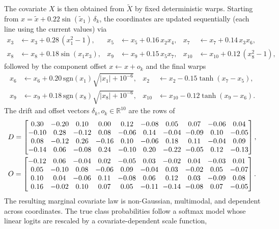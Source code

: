 \documentclass[11pt]{article}
\theoremstyle{statplain}
\theoremstyle{statdefinition}
\newcommand{\0}{\mathbf{0}}
\begin{document}
The covariate $X$ is then obtained from $\widetilde{X}$ by fixed deterministic warps. Starting from $x = \tilde{x} + 0.22\sin(\tilde{x}_1)\,\delta_k$, the coordinates are updated sequentially (each line using the current values) via
\begin{align*}
x_3 &\leftarrow x_3 + 0.28\,(x_1^2 - 1), &
x_5 &\leftarrow x_5 + 0.16\, x_2 x_4, &
x_7 &\leftarrow x_7 + 0.14\, x_3 x_6, \\
x_8 &\leftarrow x_8 + 0.18\sin(x_1 x_3), &
x_9 &\leftarrow x_9 + 0.15\, x_5 x_7, &
x_{10} &\leftarrow x_{10} + 0.12\,(x_8^2 - 1),
\end{align*}
followed by the component offset $x \leftarrow x + o_k$ and the final warps
\begin{align*}
x_6 &\leftarrow x_6 + 0.20\,\mathrm{sgn}(x_1)\sqrt{|x_1| + 10^{-6}}, &
x_2 &\leftarrow x_2 - 0.15\tanh(x_7 - x_5), \\
x_9 &\leftarrow x_9 + 0.18\,\mathrm{sgn}(x_8)\sqrt{|x_8| + 10^{-6}}, &
x_{10} &\leftarrow x_{10} - 0.12\tanh(x_9 - x_6).
\end{align*}
The drift and offset vectors $\delta_k, o_k \in \mathbb{R}^{10}$ are the rows of
{\small
\begin{gather*}
\setlength{\arraycolsep}{3pt}
D =
\begin{bmatrix}
0.30 & -0.20 & 0.10 & 0.00 & 0.12 & -0.08 & 0.05 & 0.07 & -0.06 & 0.04 \\
-0.10 & 0.28 & -0.12 & 0.08 & -0.06 & 0.14 & -0.04 & -0.09 & 0.10 & -0.05 \\
0.08 & -0.12 & 0.26 & -0.16 & 0.10 & -0.06 & 0.18 & 0.11 & -0.04 & 0.09 \\
-0.14 & 0.06 & -0.08 & 0.24 & -0.10 & 0.20 & -0.22 & -0.05 & 0.12 & -0.13
\end{bmatrix},
\\
\setlength{\arraycolsep}{3pt}
O =
\begin{bmatrix}
-0.12 & 0.06 & -0.04 & 0.02 & -0.05 & 0.03 & -0.02 & 0.04 & -0.03 & 0.01 \\
0.05 & -0.10 & 0.08 & -0.06 & 0.09 & -0.04 & 0.03 & -0.02 & 0.05 & -0.07 \\
0.10 & 0.04 & -0.06 & 0.11 & -0.08 & 0.06 & 0.12 & 0.03 & -0.09 & 0.08 \\
0.16 & -0.02 & 0.10 & 0.07 & 0.05 & -0.11 & -0.14 & -0.08 & 0.07 & -0.05
\end{bmatrix}.
\end{gather*}
}%
The resulting marginal covariate law is non-Gaussian, multimodal, and dependent across coordinates.
The true class probabilities follow a softmax model whose linear logits are rescaled by a covariate-dependent scale function,
\end{document}
